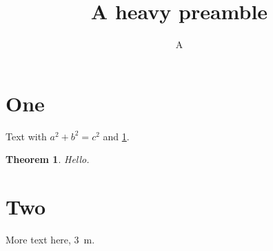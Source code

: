 \documentclass[11pt]{article}
\newtheorem{theorem}{Theorem}
\begin{document}
\title{A heavy preamble}\author{A}\maketitle
\section{One}\label{s1}
Text with $a^2+b^2=c^2$ and \cref{s1}. \begin{theorem}Hello.\end{theorem}
\section{Two} More text here, \SI{3}{\metre}.
\end{document}
